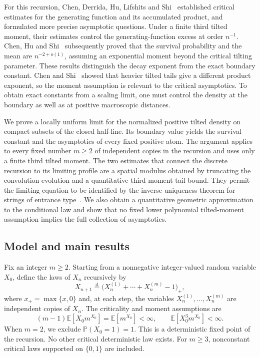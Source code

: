 \documentclass[11pt,letterpaper,reqno]{amsart}
\theoremstyle{plain}
\newcommand{\E}{\mathbb E}\newcommand{\Pp}{\mathbb P}
\begin{document}
For this recursion, Chen, Derrida, Hu, Lifshits and Shi~\cite{CDHLS} established critical estimates for the generating function and its accumulated product, and formulated more precise asymptotic questions. Under a finite third tilted moment, their estimates control the generating-function excess at order $n^{-1}$. Chen, Hu and Shi~\cite{CHS} subsequently proved that the survival probability and the mean are $n^{-2+o(1)}$, assuming an exponential moment beyond the critical tilting parameter. These results distinguish the decay exponent from the exact boundary constant. Chen and Shi~\cite{CS} showed that heavier tilted tails give a different product exponent, so the moment assumption is relevant to the critical asymptotics. To obtain exact constants from a scaling limit, one must control the density at the boundary as well as at positive macroscopic distances.

We prove a locally uniform limit for the normalized positive tilted density on compact subsets of the closed half-line. Its boundary value yields the survival constant and the asymptotics of every fixed positive atom. The argument applies to every fixed number $m\ge2$ of independent copies in the recursion and uses only a finite third tilted moment. The two estimates that connect the discrete recursion to its limiting profile are a spatial modulus obtained by truncating the convolution evolution and a quantitative third-moment tail bound. They permit the limiting equation to be identified by the inverse uniqueness theorem for strings of entrance type~\cite{Kotani}. We also obtain a quantitative geometric approximation to the conditional law and show that no fixed lower polynomial tilted-moment assumption implies the full collection of asymptotics.

\subsection{Model and main results}
Fix an integer $m\ge2$. Starting from a nonnegative integer-valued random variable $X_0$, define the laws of $X_n$ recursively by
\begin{equation}\label{eq:model}
 X_{n+1}\overset{\mathrm d}=\bigl(X_n^{(1)}+\cdots+X_n^{(m)}-1\bigr)_+,
\end{equation}
where $x_+=\max\{x,0\}$ and, at each step, the variables $X_n^{(1)},\ldots,X_n^{(m)}$ are independent copies of $X_n$. The criticality and moment assumptions are
\begin{equation}\label{eq:assumptions}
 (m-1)\E[X_0m^{X_0}]=\E[m^{X_0}]<\infty,
 \qquad \E[X_0^3m^{X_0}]<\infty.
\end{equation}
When $m=2$, we exclude $\Pp(X_0=1)=1$. This is a deterministic fixed point of the recursion. No other critical deterministic law exists. For $m\ge3$, nonconstant critical laws supported on $\{0,1\}$ are included.
\end{document}
